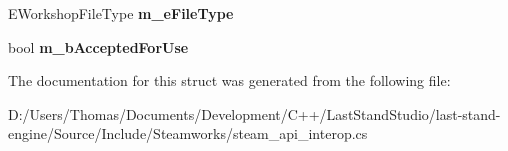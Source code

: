 \begin{DoxyCompactItemize}
\item 
\hypertarget{structValve_1_1Steamworks_1_1RemoteStorageGetPublishedFileDetailsResult__t_a01d8ad8135b91b6297d99c74050771b6}{}E\+Workshop\+File\+Type {\bfseries m\+\_\+e\+File\+Type}\label{structValve_1_1Steamworks_1_1RemoteStorageGetPublishedFileDetailsResult__t_a01d8ad8135b91b6297d99c74050771b6}

\item 
\hypertarget{structValve_1_1Steamworks_1_1RemoteStorageGetPublishedFileDetailsResult__t_aaaf430e95fd59483d70c0f3d45a9334b}{}bool {\bfseries m\+\_\+b\+Accepted\+For\+Use}\label{structValve_1_1Steamworks_1_1RemoteStorageGetPublishedFileDetailsResult__t_aaaf430e95fd59483d70c0f3d45a9334b}

\end{DoxyCompactItemize}


The documentation for this struct was generated from the following file\+:\begin{DoxyCompactItemize}
\item 
D\+:/\+Users/\+Thomas/\+Documents/\+Development/\+C++/\+Last\+Stand\+Studio/last-\/stand-\/engine/\+Source/\+Include/\+Steamworks/steam\+\_\+api\+\_\+interop.\+cs\end{DoxyCompactItemize}
